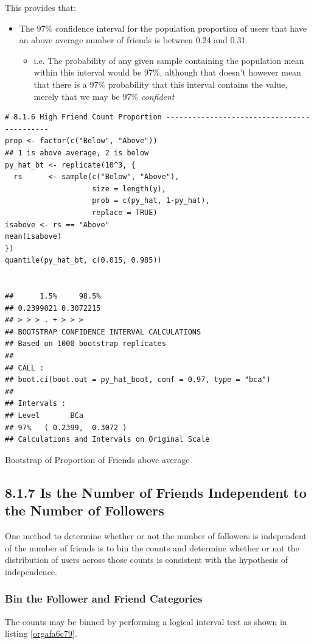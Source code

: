 \documentclass[11pt]{article}
\begin{document}
This provides that:
\begin{itemize}
\item The 97\% confidence interval for the population proportion of users that have an above average number of friends is between 0.24 and 0.31.
\begin{itemize}
\item i.e. The probability of any given sample containing the population mean within this interval would be 97\%, although  that doesn't however mean that there is a 97\% probability that this interval contains the value, merely that we may be 97\% \emph{confident}
\end{itemize}
\end{itemize}

\begin{listing}[htbp]
\begin{verbatim}
# 8.1.6 High Friend Count Proportion -------------------------------------------
prop <- factor(c("Below", "Above"))
## 1 is above average, 2 is below
py_hat_bt <- replicate(10^3, {
  rs      <- sample(c("Below", "Above"),
                    size = length(y),
                    prob = c(py_hat, 1-py_hat),
                    replace = TRUE)
isabove <- rs == "Above"
mean(isabove)
})
quantile(py_hat_bt, c(0.015, 0.985))


##      1.5%     98.5%
## 0.2399021 0.3072215
## > > > . + > > >
## BOOTSTRAP CONFIDENCE INTERVAL CALCULATIONS
## Based on 1000 bootstrap replicates
##
## CALL :
## boot.ci(boot.out = py_hat_boot, conf = 0.97, type = "bca")
##
## Intervals :
## Level       BCa
## 97%   ( 0.2399,  0.3072 )
## Calculations and Intervals on Original Scale
\end{verbatim}
\caption{\label{org78fe714}Bootstrap of Proportion of Friends above average}
\end{listing}
\subsection{8.1.7 Is the Number of Friends Independent to the Number of Followers}
\label{sec:org60d1fb2}
One method to determine whether or not the number of followers is independent of the number of friends is to bin the counts and determine whether or not the distribution of users across those counts is consistent with the hypothesis of independence.

\subsubsection{Bin the Follower and Friend Categories}
\label{sec:orgf22dafb}
The counts may be binned by performing a logical interval test as shown in listing \ref{orgafa6c79}.
\end{document}

